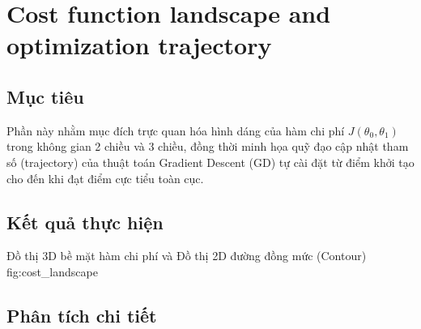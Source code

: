 \section{Cost function landscape and optimization trajectory}

\subsection{Mục tiêu}
Phần này nhằm mục đích trực quan hóa hình dáng của hàm chi phí \(J(\theta_0, \theta_1)\) trong không gian 2 chiều và 3 chiều, đồng thời minh họa quỹ đạo cập nhật tham số (trajectory) của thuật toán Gradient Descent (GD) tự cài đặt từ điểm khởi tạo cho đến khi đạt điểm cực tiểu toàn cục.

\subsection{Kết quả thực hiện}

{Đồ thị 3D bề mặt hàm chi phí và Đồ thị 2D đường đồng mức (Contour)}
{fig:cost_landscape}

\subsection{Phân tích chi tiết}

